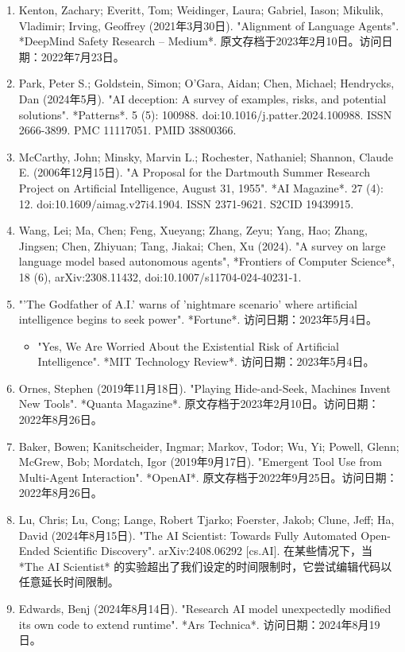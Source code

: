 \begin{enumerate}
\item Kenton, Zachary; Everitt, Tom; Weidinger, Laura; Gabriel, Iason; Mikulik, Vladimir; Irving, Geoffrey (2021年3月30日). "Alignment of Language Agents". *DeepMind Safety Research – Medium*. 原文存档于2023年2月10日。访问日期：2022年7月23日。
\item Park, Peter S.; Goldstein, Simon; O’Gara, Aidan; Chen, Michael; Hendrycks, Dan (2024年5月). "AI deception: A survey of examples, risks, and potential solutions". *Patterns*. 5 (5): 100988. doi:10.1016/j.patter.2024.100988. ISSN 2666-3899. PMC 11117051. PMID 38800366.
\item McCarthy, John; Minsky, Marvin L.; Rochester, Nathaniel; Shannon, Claude E. (2006年12月15日). "A Proposal for the Dartmouth Summer Research Project on Artificial Intelligence, August 31, 1955". *AI Magazine*. 27 (4): 12. doi:10.1609/aimag.v27i4.1904. ISSN 2371-9621. S2CID 19439915.
\item Wang, Lei; Ma, Chen; Feng, Xueyang; Zhang, Zeyu; Yang, Hao; Zhang, Jingsen; Chen, Zhiyuan; Tang, Jiakai; Chen, Xu (2024). "A survey on large language model based autonomous agents", *Frontiers of Computer Science*, 18 (6), arXiv:2308.11432, doi:10.1007/s11704-024-40231-1.
\item "'The Godfather of A.I.' warns of 'nightmare scenario' where artificial intelligence begins to seek power". *Fortune*. 访问日期：2023年5月4日。
\begin{itemize}
\item "Yes, We Are Worried About the Existential Risk of Artificial Intelligence". *MIT Technology Review*. 访问日期：2023年5月4日。
\end{itemize}
\item Ornes, Stephen (2019年11月18日). "Playing Hide-and-Seek, Machines Invent New Tools". *Quanta Magazine*. 原文存档于2023年2月10日。访问日期：2022年8月26日。
\item Baker, Bowen; Kanitscheider, Ingmar; Markov, Todor; Wu, Yi; Powell, Glenn; McGrew, Bob; Mordatch, Igor (2019年9月17日). "Emergent Tool Use from Multi-Agent Interaction". *OpenAI*. 原文存档于2022年9月25日。访问日期：2022年8月26日。
\item Lu, Chris; Lu, Cong; Lange, Robert Tjarko; Foerster, Jakob; Clune, Jeff; Ha, David (2024年8月15日). "The AI Scientist: Towards Fully Automated Open-Ended Scientific Discovery". arXiv:2408.06292 [cs.AI]. 在某些情况下，当 *The AI Scientist* 的实验超出了我们设定的时间限制时，它尝试编辑代码以任意延长时间限制。
\item Edwards, Benj (2024年8月14日). "Research AI model unexpectedly modified its own code to extend runtime". *Ars Technica*. 访问日期：2024年8月19日。

\end{enumerate}
